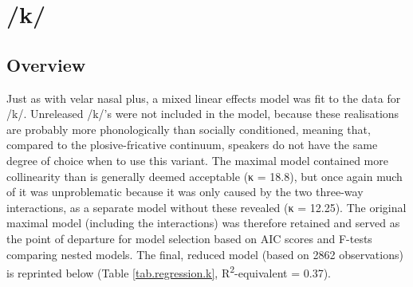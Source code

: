 \section{/k/}
\label{prod.res.con.k}

\subsection{Overview}
\label{sec.prod.res.con.k.overview}

Just as with velar nasal plus, a mixed linear effects model was fit to the data for /k/.
Unreleased /k/'s were not included in the model, because these realisations are probably more phonologically than socially conditioned, meaning that, compared to the plosive-fricative continuum, speakers do not have the same degree of choice when to use this variant.
The maximal model contained more collinearity than is generally deemed acceptable (κ = 18.8), but once again much of it was unproblematic because it was only caused by the two three-way interactions, as a separate model without these revealed (κ = 12.25).
The original maximal model (including the interactions) was therefore retained and served as the point of departure for model selection based on AIC scores and F-tests comparing nested models.
The final, reduced model (based on 2862 observations) is reprinted below (Table \ref{tab.regression.k}, R\textsuperscript{2}-equivalent = 0.37).

